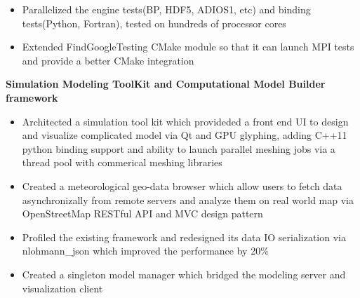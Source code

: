 \begin{cventries}
{\begin{cvitems}
\begin{itemize}
              \item {Parallelized the engine tests(BP, HDF5, ADIOS1, etc) and binding tests(Python, Fortran), tested on hundreds of processor cores}
              \item {Extended FindGoogleTesting CMake module so that it can launch MPI tests and provide a better CMake integration}
          \end{itemize}
        \item {\fontsize{10pt}{1em}\bodyfont\bfseries\color{darktext}Simulation Modeling ToolKit and Computational Model Builder framework}
          \begin{itemize}
              \item {Architected a simulation tool kit which provideded a front end UI to design and visualize complicated model via Qt and GPU glyphing, adding C++11 python binding support and ability to launch parallel meshing jobs via a thread pool with commerical meshing libraries}
              \item {Created a meteorological geo-data browser which allow users to fetch data asynchronizally from remote servers and analyze them on real world map via OpenStreetMap RESTful API and MVC design pattern}
              \item {Profiled the existing framework and redesigned its data I\/O serialization via nlohmann\_json which improved the performance by 20\%}
              \item {Created a singleton model manager which bridged the modeling server and visualization client}
          \end{itemize}
      \end{cvitems}
    }


\end{cventries}
